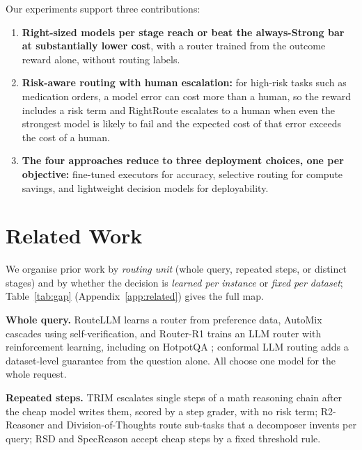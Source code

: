 \documentclass{article}
\begin{document}
Our experiments support three contributions:
\begin{enumerate}
\item \textbf{Right-sized models per stage reach or beat the always-Strong bar at substantially lower cost}, with a router trained from the outcome reward alone, without routing labels.
\item \textbf{Risk-aware routing with human escalation:} for high-risk tasks such as medication orders, a model error can cost more than a human, so the reward includes a risk term and RightRoute escalates to a human when even the strongest model is likely to fail and the expected cost of that error exceeds the cost of a human.
\item \textbf{The four approaches reduce to three deployment choices, one per objective:} fine-tuned executors for accuracy, selective routing for compute savings, and lightweight decision models for deployability.
\end{enumerate}

\section{Related Work}
\label{sec:related}

We organise prior work by \emph{routing unit} (whole query, repeated steps, or distinct stages) and by whether the decision is \emph{learned per instance} or \emph{fixed per dataset}; Table~\ref{tab:gap} (Appendix~\ref{app:related}) gives the full map.

\textbf{Whole query.} RouteLLM \citep{ong2025routellm} learns a router from preference data, AutoMix \citep{aggarwal2024automix} cascades using self-verification, and Router-R1 \citep{zhang2025routerr1} trains an LLM router with reinforcement learning, including on HotpotQA \citep[see also][]{chen2023frugalgpt,ding2024hybrid,dekoninck2025unified}; conformal LLM routing \citep{uddin2026conformal} adds a dataset-level guarantee from the question alone. All choose one model for the whole request.

\textbf{Repeated steps.} TRIM \citep{trim2026} escalates single steps of a math reasoning chain after the cheap model writes them, scored by a step grader, with no risk term; R2-Reasoner \citep{r2reasoner2025} and Division-of-Thoughts \citep{shao2025dot} route sub-tasks that a decomposer invents per query; RSD \citep{liao2025rsd} and SpecReason \citep{pan2025specreason} accept cheap steps by a fixed threshold rule.
\end{document}
